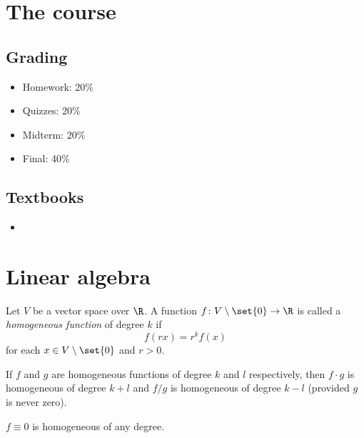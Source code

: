 \chapter*{The course} \label{chp:course}

\section*{Grading} \label{sec:grading}
\begin{itemize}
    \item Homework: 20\%
    \item Quizzes: 20\%
    \item Midterm: 20\%
    \item Final: 40\%
\end{itemize}

\section*{Textbooks} \label{sec:books}
\begin{itemize}
    \item 
\end{itemize}

\chapter{Linear algebra} \label{chp:linalg}

\begin{definition} \label{def:home}
    Let $V$ be a vector space over $\R$.
    A function $f\colon V \setminus \set{0} \to \R$ is called
    a \emph{homogeneous function} of degree $k$ if \[
        f(r x) = r^k f(x)
    \] for each $x \in V \setminus \set{0}$ and $r > 0$.
\end{definition}
\begin{remarks}
    \item If $f$ and $g$ are homogeneous functions of degree $k$ and $l$
    respectively, then $f \cdot g$ is homogeneous of degree $k + l$
    and $f / g$ is homogeneous of degree $k - l$
    (provided $g$ is never zero).
    \item $f \equiv 0$ is homogeneous of any degree.
\end{remarks}


